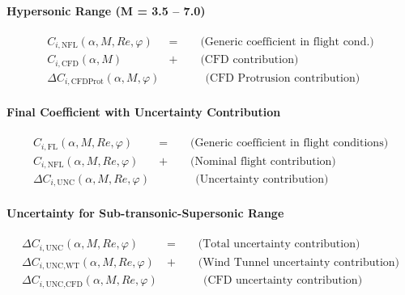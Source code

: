\documentclass[12pt]{article}
\begin{document}
\paragraph{\textbf{Hypersonic Range (M = 3.5 – 7.0)}}
\begin{align}
C_{i,\text{NFL}}(\alpha, M, Re, \varphi) &= \qquad \text{(Generic coefficient in flight cond.)} \\
C_{i,\text{CFD}}(\alpha, M) &+ \qquad \text{(CFD contribution)} \\
\Delta C_{i,\text{CFDProt}}(\alpha, M, \varphi) & \quad \ \qquad \text{(CFD Protrusion contribution)}
\end{align}
%
\paragraph{\textbf{Final Coefficient with Uncertainty Contribution}}
\begin{align}
C_{i,\text{FL}}(\alpha, M, Re, \varphi) &= \qquad \text{(Generic coefficient in flight conditions)} \\
C_{i,\text{NFL}}(\alpha, M, Re, \varphi) &+ \qquad \text{(Nominal flight contribution)} \\
\Delta C_{i,\text{UNC}}(\alpha, M, Re, \varphi) & \quad \ \qquad \text{(Uncertainty contribution)}
\end{align}
%
\paragraph{\textbf{Uncertainty for Sub-transonic-Supersonic Range}}
\begin{align}
\Delta C_{i,\text{UNC}}(\alpha, M, Re, \varphi) &= \qquad \text{(Total uncertainty contribution)} \\
\Delta C_{i,\text{UNC,WT}}(\alpha, M, Re, \varphi) &+ \qquad \text{(Wind Tunnel uncertainty contribution)} \\
\Delta C_{i,\text{UNC,CFD}}(\alpha, M, Re, \varphi) & \quad \ \qquad \text{(CFD uncertainty contribution)}
\end{align}
%
\end{document}

